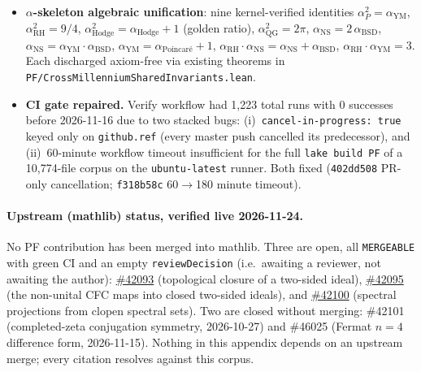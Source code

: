 \begin{itemize}
      capstone's proof is \texttt{intro \_n \_h; trivial}. The
      disclosure is kernel-explicit in
      \texttt{standard\_fermat\_at\_pf\_encoding\_iff}, which proves
      \texttt{Standard\_FermatLastTheorem\_Standard PF\_FermatEncoding}
      $\leftrightarrow$ \texttt{True}. The four genuine sub-conjuncts
      are untouched by this correction.
\item \textbf{$\alpha$-skeleton algebraic unification}: nine
      kernel-verified identities
      $\alpha_P^2 = \alpha_{\text{YM}}$,
      $\alpha_{\text{RH}}^2 = 9/4$,
      $\alpha_{\text{Hodge}}^2 = \alpha_{\text{Hodge}} + 1$ (golden ratio),
      $\alpha_{\text{QG}}^2 = 2\pi$,
      $\alpha_{\text{NS}} = 2\,\alpha_{\text{BSD}}$,
      $\alpha_{\text{NS}} = \alpha_{\text{YM}} \cdot \alpha_{\text{BSD}}$,
      $\alpha_{\text{YM}} = \alpha_{\text{Poincar\'e}} + 1$,
      $\alpha_{\text{RH}} \cdot \alpha_{\text{NS}} = \alpha_{\text{NS}} + \alpha_{\text{BSD}}$,
      $\alpha_{\text{RH}} \cdot \alpha_{\text{YM}} = 3$.
      Each discharged axiom-free via existing theorems in
      \texttt{PF/CrossMillenniumSharedInvariants.lean}.
\item \textbf{CI gate repaired.} Verify workflow had 1,223 total runs
      with 0 successes before 2026-11-16 due to two stacked bugs:
      (i)~\texttt{cancel-in-progress: true} keyed only on
      \texttt{github.ref} (every master push cancelled its predecessor),
      and (ii)~60-minute workflow timeout insufficient for the full
      \texttt{lake build PF} of a 10{,}774-file corpus on the
      \texttt{ubuntu-latest} runner. Both fixed (\texttt{402dd508}
      PR-only cancellation; \texttt{f318b58c} 60$\to$180 minute timeout).
\end{itemize}

\paragraph{Upstream (mathlib) status, verified live 2026-11-24.}
No PF contribution has been merged into mathlib. Three are open, all
\texttt{MERGEABLE} with green CI and an empty \texttt{reviewDecision} (i.e.\
awaiting a reviewer, not awaiting the author):
\href{https://github.com/leanprover-community/mathlib4/pull/42093}{\#42093}
(topological closure of a two-sided ideal),
\href{https://github.com/leanprover-community/mathlib4/pull/42095}{\#42095}
(the non-unital CFC maps into closed two-sided ideals), and
\href{https://github.com/leanprover-community/mathlib4/pull/42100}{\#42100}
(spectral projections from clopen spectral sets). Two are closed without
merging: \#42101 (completed-zeta conjugation symmetry, 2026-10-27) and
\#46025 (Fermat $n=4$ difference form, 2026-11-15). Nothing in this appendix
depends on an upstream merge; every citation resolves against this corpus.

